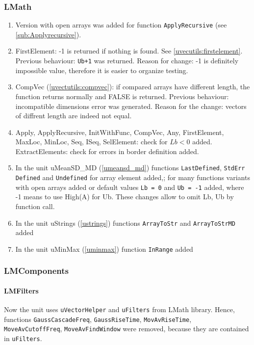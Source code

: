 \documentclass[12pt,a4paper,oneside]{report}
\newcommand{\code}[1]{\texttt{#1}}
\begin{document}
\subsubsection{LMath}
\begin{enumerate}
	\item{Version with open arrays was added for function \code{ApplyRecursive} (see \ref{sub:Applyrecursive})}.
	\item{FirstElement: -1 is returned if nothing is found. See \ref{uvecutils:firstelement}. Previous behaviour: \code{Ub+1} was returned. Reason for change: -1 is definitely impossible value, therefore it is easier to organize testing.}
	\item{CompVec (\ref{uvectutils:compvec}): if compared arrays have different length, the function returns normally and FALSE is returned. Previous behaviour: incompatible dimensions error was generated. Reason for the change: vectors of diffrent length are indeed not equal.}
	\item{Apply, ApplyRecursive, InitWithFunc, CompVec, Any, FirstElement, MaxLoc, MinLoc, Seq, ISeq, SelElement: check for $Lb<0$ added.
		ExtractElements: check for errors in border definition added.}
	\item{In the unit uMeanSD{\_}MD (\ref{umeansd_md}) functions \code{LastDefined}, \code{StdErr} \code{Defined} and \code{Undefined} for array element added,; for many functions variants with open arrays added or default values \code{Lb = 0} and \code{Ub = -1} added, where -1 means to use High(A) for Ub. These changes allow to omit Lb, Ub by function call.}
	\item{In the unit uStrings (\ref{ustrings}) functions \code{ArrayToStr} and \code{ArrayToStrMD} added}
	\item{In the unit uMinMax (\ref{uminmax}) function \code{InRange} added}
\end{enumerate}
\subsubsection{LMComponents}
\paragraph{LMFilters}
 Now the unit uses \code{uVectorHelper} and \code{uFilters} from LMath library. Hence, functions \code{GaussCascadeFreq}, \code{GaussRiseTime}, \code{MovAvRiseTime}, \code{MoveAvCutoffFreq},	\code{MoveAvFindWindow} were removed, because they are contained in \code{uFilters}.
\end{document}
